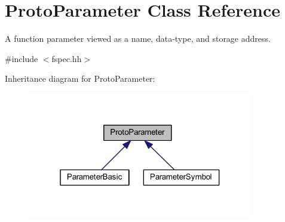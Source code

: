 \hypertarget{class_proto_parameter}{}\section{Proto\+Parameter Class Reference}
\label{class_proto_parameter}


A function parameter viewed as a name, data-\/type, and storage address.  




{\ttfamily \#include $<$fspec.\+hh$>$}



Inheritance diagram for Proto\+Parameter\+:
\nopagebreak
\begin{figure}[H]
\begin{center}
\leavevmode
\includegraphics[width=280pt]{class_proto_parameter__inherit__graph}
\end{center}
\end{figure}
